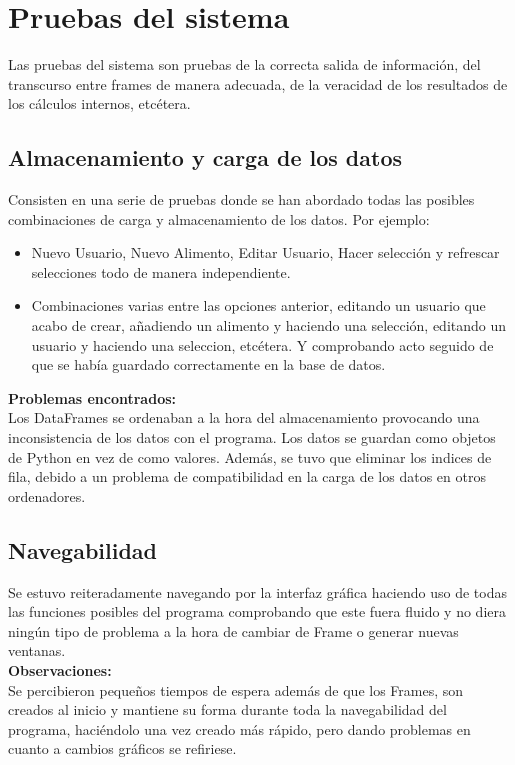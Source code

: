 \section{Pruebas del sistema}
Las pruebas del sistema son pruebas de la correcta salida de información, del transcurso entre frames de manera adecuada, de la veracidad de los resultados de los cálculos internos, etcétera.
\subsection{Almacenamiento y carga de los datos}
Consisten en una serie de pruebas donde se han abordado todas las posibles combinaciones de carga y almacenamiento de los datos. Por ejemplo:
\begin{itemize}
\item Nuevo Usuario, Nuevo Alimento, Editar Usuario, Hacer selección y refrescar selecciones todo de manera independiente.
\item Combinaciones varias entre las opciones anterior, editando un usuario que acabo de crear, añadiendo un alimento y haciendo una selección, editando un usuario y haciendo una seleccion, etcétera. Y comprobando acto seguido de que se había guardado correctamente en la base de datos.
\end{itemize}
\textbf{Problemas encontrados:}\\
Los DataFrames se ordenaban a la hora del almacenamiento provocando una inconsistencia de los datos con el programa. Los datos se guardan como objetos de Python en vez de como valores. Además, se tuvo que eliminar los indices de fila, debido a un problema de compatibilidad en la carga de los datos en otros ordenadores.
\subsection{Navegabilidad}
Se estuvo reiteradamente navegando por la interfaz gráfica haciendo uso de todas las funciones posibles del programa comprobando que este fuera fluido y no diera ningún tipo de problema a la hora de cambiar de Frame o generar nuevas ventanas.\\
\textbf{Observaciones:}\\
Se percibieron pequeños tiempos de espera además de que los Frames, son creados al inicio y mantiene su forma durante toda la navegabilidad del programa, haciéndolo una vez creado más rápido, pero dando problemas en cuanto a cambios gráficos se refiriese.
